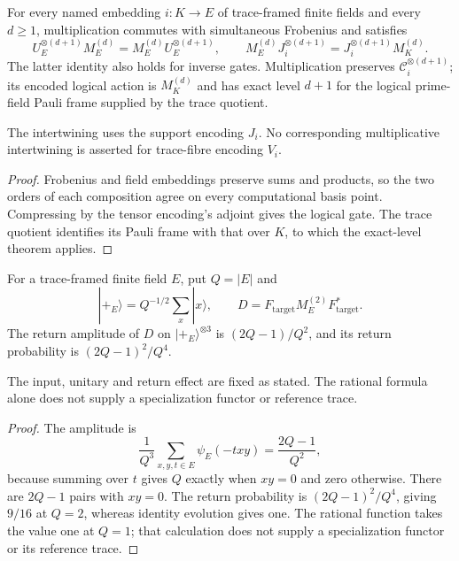 \begin{theorem}
{\normalfont\statusProved}\quad
For every named embedding $i:K\to E$ of trace-framed finite fields
and every $d\geq1$, multiplication commutes with simultaneous Frobenius
and satisfies
\[
 U_E^{\otimes(d+1)}M_E^{(d)}
 =M_E^{(d)}U_E^{\otimes(d+1)},\qquad
 M_E^{(d)}J_i^{\otimes(d+1)}
 =J_i^{\otimes(d+1)}M_K^{(d)}.
\]
The latter identity also holds for inverse gates.  Multiplication
preserves $\mathcal C_i^{\otimes(d+1)}$; its encoded logical action
is $M_K^{(d)}$ and has exact level $d+1$ for the logical prime-field
Pauli frame supplied by the trace quotient.
\end{theorem}
\begin{scope}
The intertwining uses the support encoding $J_i$.  No corresponding
multiplicative intertwining is asserted for trace-fibre encoding $V_i$.
\end{scope}
\begin{proof}
Frobenius and field embeddings preserve sums and products, so the two
orders of each composition agree on every computational basis point.
Compressing by the tensor encoding's adjoint gives the logical gate.
The trace quotient identifies its Pauli frame with that over $K$, to
which the exact-level theorem applies.
\end{proof}

\begin{proposition}
{\normalfont\statusProved}\quad
For a trace-framed finite field $E$, put $Q=|E|$ and
\[
 |+_E\rangle=Q^{-1/2}\sum_x|x\rangle,\qquad
 D=F_{\mathrm{target}}M_E^{(2)}F_{\mathrm{target}}^*.
\]
The return amplitude of $D$ on $|+_E\rangle^{\otimes3}$ is
$(2Q-1)/Q^2$, and its return probability is $(2Q-1)^2/Q^4$.
\end{proposition}
\begin{scope}
The input, unitary and return effect are fixed as stated.  The rational
formula alone does not supply a specialization functor or reference trace.
\end{scope}
\begin{proof}
The amplitude is
\[
 \frac1{Q^3}\sum_{x,y,t\in E}\psi_E(-txy)
 =\frac{2Q-1}{Q^2},
\]
because summing over $t$ gives $Q$ exactly when $xy=0$ and zero
otherwise.  There are $2Q-1$ pairs with $xy=0$.  The return probability
is $(2Q-1)^2/Q^4$, giving $9/16$ at $Q=2$, whereas identity evolution
gives one.  The rational function takes the value one at $Q=1$; that
calculation does not supply a specialization functor or its reference trace.
\end{proof}

